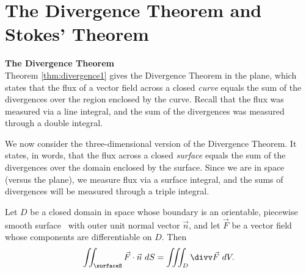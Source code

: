 \section{The Divergence Theorem and Stokes' Theorem}\label{sec:stokes_divergence}

\noindent\textbf{\large The Divergence Theorem}\\

Theorem \ref{thm:divergence1} gives the Divergence Theorem in the plane, which states that the flux of a vector field across a closed \emph{curve} equals the sum of the divergences over the region enclosed by the curve. Recall that the flux was measured via a line integral, and the sum of the divergences was measured through a double integral.

We now consider the three-dimensional version of the Divergence Theorem. It states, in words, that the flux across a closed \emph{surface} equals the sum of the divergences over the domain enclosed by the surface. Since we are in space (versus the plane), we measure flux via a surface integral, and the sums of divergences will be measured through a triple integral.

{Let $D$ be a closed domain in space whose boundary is an orientable, piecewise smooth surface \surfaceS\ with outer unit normal vector $\vec n$, and let $\vec F$ be a vector field whose components are differentiable on $D$. Then
$$\iint_\surfaceS \vec F\cdot\vec n\ dS =\iiint_D \divv \vec F\ dV.$$ 
}

